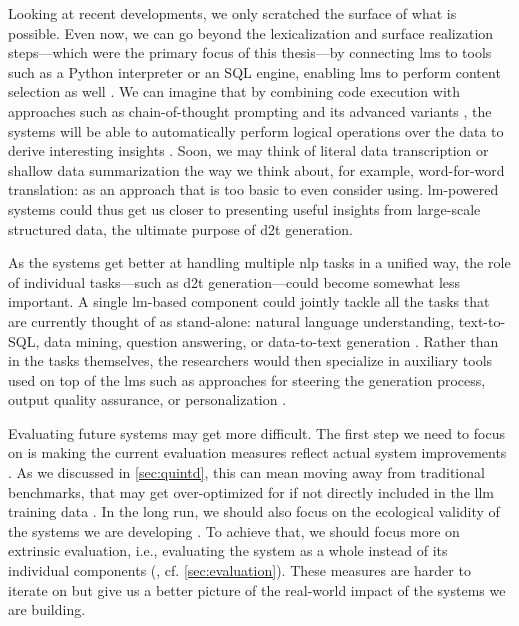 Looking at recent developments, we only scratched the surface of what is possible. Even now, we can go beyond the lexicalization and surface realization steps---which were the primary focus of this thesis---by connecting \acp{lm} to tools such as a Python interpreter or an SQL engine, enabling \acp{lm} to perform content selection as well \cite{cao-etal-2023-api,jiang-etal-2023-structgpt,gemmell2023generate}. We can imagine that by combining code execution with approaches such as chain-of-thought prompting and its advanced variants \cite{weiChainThoughtPrompting2022,chu2023survey}, the systems will be able to automatically perform logical operations over the data to derive interesting insights \cite{zhao-etal-2023-qtsumm,chenLogicalNaturalLanguage2020,chenLogic2TextHighFidelityNatural2020}. Soon, we may think of literal data transcription or shallow data summarization the way we think about, for example, word-for-word translation: as an approach that is too basic to even consider using. \ac{lm}-powered systems could thus get us closer to presenting useful insights from large-scale structured data, the ultimate purpose of \ac{d2t} generation.

As the systems get better at handling multiple \ac{nlp} tasks in a unified way, the role of individual tasks---such as \ac{d2t} generation---could become somewhat less important. A single \ac{lm}-based component could jointly tackle all the tasks that are currently thought of as stand-alone: natural language understanding, text-to-SQL, data mining, question answering, or data-to-text generation \cite{schopf-etal-2023-exploring,chen2024multi}. Rather than in the tasks themselves, the researchers would then specialize in auxiliary tools used on top of the \acp{lm} such as approaches for steering the generation process, output quality assurance, or personalization \cite{zhang2023survey,chen2023personalization}.


Evaluating future systems may get more difficult. The first step we need to focus on is making the current evaluation measures reflect actual system improvements \cite{gehrmannRepairingCrackedFoundation2022,van_miltenburg_barriers_2023}.  As we discussed in \autoref{sec:quintd}, this can mean moving away from traditional benchmarks, that may get over-optimized for \cite{kiela-etal-2021-dynabench,raji2021ai} if not directly included in the \ac{llm} training data \cite{balloccu2024leak}. In the long run, we should also focus on the ecological validity of the systems we are developing \cite{reiter2020ecological}. To achieve that, we should focus more on extrinsic evaluation, i.e., evaluating the system as a whole instead of its individual components (\citealp{reiter2003stop,di-eugenio-etal-2002-diag}, cf. \autoref{sec:evaluation}). These measures are harder to iterate on but give us a better picture of the real-world impact of the systems we are building.


